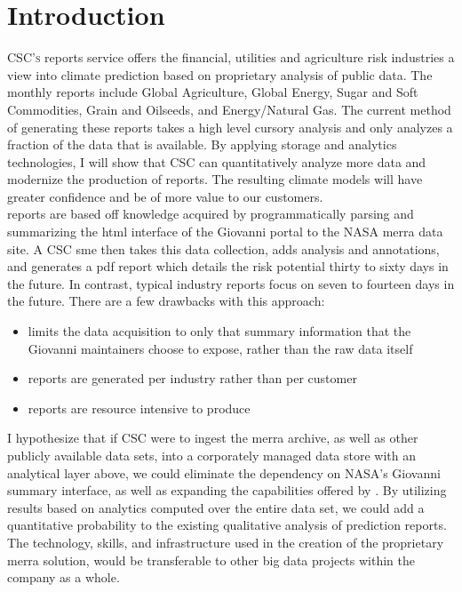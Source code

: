 
\chapter{Introduction}
\textsc{CSC's} \climatedge reports service offers the financial, utilities and agriculture risk industries a view into climate prediction based on proprietary analysis of public data. The monthly reports include Global Agriculture, Global Energy, Sugar and Soft Commodities, Grain and Oilseeds, and Energy/Natural Gas\cite{climatedgeurl}. The current method of generating these reports takes a high level cursory analysis and only analyzes a fraction of the data that is available. By applying  storage and analytics technologies, I will show that \textsc{CSC} can quantitatively analyze more data and modernize the production of \climatedge reports. The resulting climate models will have greater confidence and be of more value to our customers.\\

\climatedge reports are based off knowledge acquired by programmatically parsing and summarizing the \gls{html} interface of the Giovanni\cite{giovanni} portal to the NASA \gls{merra} data site.  A \textsc{CSC} \gls{sme} then takes this data collection, adds analysis and annotations, and generates a \gls{pdf} report which details the risk potential thirty to sixty days in the future. In contrast, typical industry reports focus on seven to fourteen days in the future. There are a few drawbacks with this approach:
\begin{itemize}
    \item{limits the data acquisition to only that summary information that the Giovanni  maintainers choose to expose, rather than the raw data itself}
    \item{reports are generated per industry rather than per customer}
    \item{reports are resource intensive to produce}
\end{itemize}
I hypothesize that if \textsc{CSC} were to ingest the \gls{merra} archive, as well as other publicly available data sets, into a corporately managed data store with an analytical layer above, we could eliminate the dependency on NASA's Giovanni summary interface, as well as expanding the capabilities offered by \climatedge. By utilizing results based on analytics computed over the entire data set, we could add a quantitative probability to the existing qualitative analysis of \climatedge prediction reports. The technology, skills, and infrastructure used in the creation of the proprietary \gls{merra} solution, would be transferable to other big data projects within the company as a whole.\\


